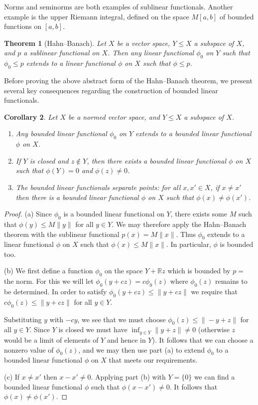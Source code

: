 \documentclass[11pt,oneside]{amsbook}
\newcommand{\RR}{{\mathbb R}}
\theoremstyle{definition}
\theoremstyle{plain}
\newtheorem{thm}{Theorem}[section]
\newtheorem{cor}[thm]{Corollary}
\theoremstyle{definition}
\theoremstyle{remark}
\numberwithin{equation}{section}
\numberwithin{figure}{section}
\begin{document}
Norms and seminorms are both examples of sublinear functionals. Another example is the upper Riemann integral, defined on the space $M[a,b]$ of bounded functions on $[a,b]$.

\begin{thm}[Hahn--Banach]
  \label{thm:hb}
  Let $X$ be a vector space, $Y\leq X$ a subspace of $X$, and $p$ a sublinear functional on $X$. Then any linear functional $\phi_0$ on $Y$ such that $\phi_0\leq p$ extends to a linear functional $\phi$ on $X$ such that $\phi\leq p$.
\end{thm}

Before proving the above abstract form of the Hahn--Banach theorem, we present several key consequences regarding the construction of bounded linear functionals.

\begin{cor}
  \label{cor:hb}
  Let $X$ be a normed vector space, and $Y\leq X$ a subspace of $X$.
  \begin{enumerate}
  \item Any bounded linear functional $\phi_0$ on $Y$ extends to a bounded linear functional $\phi$ on $X$.
  \item If $Y$ is closed and $z\notin Y$, then there exists a bounded linear functional $\phi$ on $X$ such that $\phi(Y)=0$ and $\phi(z)\neq0$.
  \item The bounded linear functionals separate points: for all $x,x'\in X$, if $x\neq x'$ then there is a bounded linear functional $\phi$ on $X$ such that $\phi(x)\neq\phi(x')$.
  \end{enumerate}
\end{cor}

\begin{proof}
  (a) Since $\phi_0$ is a bounded linear functional on $Y$, there exists some $M$ such that $\phi(y)\leq M\|y\|$ for all $y\in Y$. We may therefore apply the Hahn--Banach theorem with the sublinear functional $p(x)=M\|x\|$. Thus $\phi_0$ extends to a linear functional $\phi$ on $X$ such that $\phi(x)\leq M\|x\|$. In particular, $\phi$ is bounded too.

  (b) We first define a function $\phi_0$ on the space $Y+\RR z$ which is bounded by $p=$ the norm. For this we will let $\phi_0(y+cz)=c\phi_0(z)$ where $\phi_0(z)$ remains to be determined. In order to satisfy $\phi_0(y+cz)\leq\|y+cz\|$ we require that $c\phi_0(z)\leq\|y+cz\|$ for all $y\in Y$.

  Substituting $y$ with $-cy$, we see that we must choose $\phi_0(z)\leq\|-y+z\|$ for all $y\in Y$. Since $Y$ is closed we must have $\inf_{y\in Y}\|y+z\|\neq0$ (otherwise $z$ would be a limit of elements of $Y$ and hence in $Y$). It follows that we can choose a nonzero value of $\phi_0(z)$, and we may then use part (a) to extend $\phi_0$ to a bounded linear functional $\phi$ on $X$ that meets our requirements.

  (c) If $x\neq x'$ then $x-x'\neq0$. Applying part (b) with $Y=\{0\}$ we can find a bounded linear functional $\phi$ such that $\phi(x-x')\neq0$. It follows that $\phi(x)\neq\phi(x')$.
\end{proof}
\end{document}
